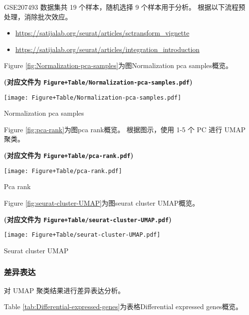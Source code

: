 \documentclass[
]{article}
\providecommand{\tightlist}{%
  \setlength{\itemsep}{0pt}\setlength{\parskip}{0pt}}
\begin{document}
GSE207493 数据集共 19 个样本，随机选择 9 个样本用于分析。
根据以下流程预处理，消除批次效应。

\begin{itemize}
\tightlist
\item
  \url{https://satijalab.org/seurat/articles/sctransform_vignette}
\item
  \url{https://satijalab.org/seurat/articles/integration_introduction}
\end{itemize}

Figure \ref{fig:Normalization-pca-samples}为图Normalization pca samples概览。

\textbf{(对应文件为 \texttt{Figure+Table/Normalization-pca-samples.pdf})}

\def\@captype{figure}
\begin{center}
\texttt{[image: Figure+Table/Normalization-pca-samples.pdf]}
\caption{Normalization pca samples}\label{fig:Normalization-pca-samples}
\end{center}

Figure \ref{fig:pca-rank}为图pca rank概览。
根据图示，使用 1-5 个 PC 进行 UMAP 聚类。

\textbf{(对应文件为 \texttt{Figure+Table/pca-rank.pdf})}

\def\@captype{figure}
\begin{center}
\texttt{[image: Figure+Table/pca-rank.pdf]}
\caption{Pca rank}\label{fig:pca-rank}
\end{center}

Figure \ref{fig:seurat-cluster-UMAP}为图seurat cluster UMAP概览。

\textbf{(对应文件为 \texttt{Figure+Table/seurat-cluster-UMAP.pdf})}

\def\@captype{figure}
\begin{center}
\texttt{[image: Figure+Table/seurat-cluster-UMAP.pdf]}
\caption{Seurat cluster UMAP}\label{fig:seurat-cluster-UMAP}
\end{center}

\hypertarget{ux5deeux5f02ux8868ux8fbe}{%
\subsubsection{差异表达}\label{ux5deeux5f02ux8868ux8fbe}}

对 UMAP 聚类结果进行差异表达分析。

Table \ref{tab:Differential-expressed-genes}为表格Differential expressed genes概览。
\end{document}
